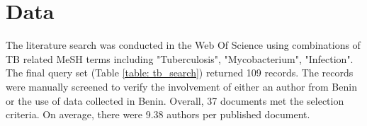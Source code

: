 
\section{Data}
\label{sec:tb_data}
The literature search was conducted in the Web Of Science using combinations of TB related MeSH terms including "Tuberculosis", "Mycobacterium", "Infection". 
The final query set (Table \ref{table: tb_search}) returned 109 records. The records were manually screened to verify the involvement of either an author from Benin or the use of data collected in Benin. Overall, 37 documents met the selection criteria. On average, there were 9.38 authors per published document. %


